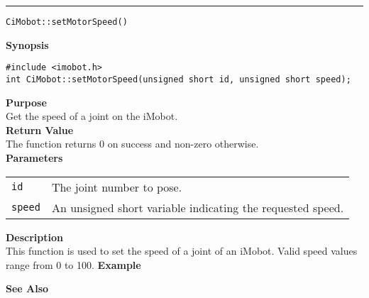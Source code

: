 \noindent
\vspace{5pt}
\rule{6.5in}{0.015in}
\noindent
{\LARGE \texttt{CiMobot::setMotorSpeed()}}\\
{}

\noindent
{\bf Synopsis}\\
\begin{verbatim}
#include <imobot.h>
int CiMobot::setMotorSpeed(unsigned short id, unsigned short speed);
\end{verbatim}

\noindent
{\bf Purpose}\\
Get the speed of a joint on the iMobot.\\

\noindent
{\bf Return Value}\\
The function returns 0 on success and non-zero otherwise.\\

\noindent
{\bf Parameters}
\vspace{-0.1in}
\begin{description}
\item               
\begin{tabular}{p{10 mm}p{145 mm}}
\texttt{id} & The joint number to pose. \\
\texttt{speed} & An unsigned short variable indicating the requested speed.
\end{tabular}
\end{description}

\noindent
{\bf Description}\\
This function is used to set the speed of a joint of an iMobot. Valid speed
values range from 0 to 100.
\noindent
{\bf Example}\\
\noindent

\noindent
{\bf See Also}\\

